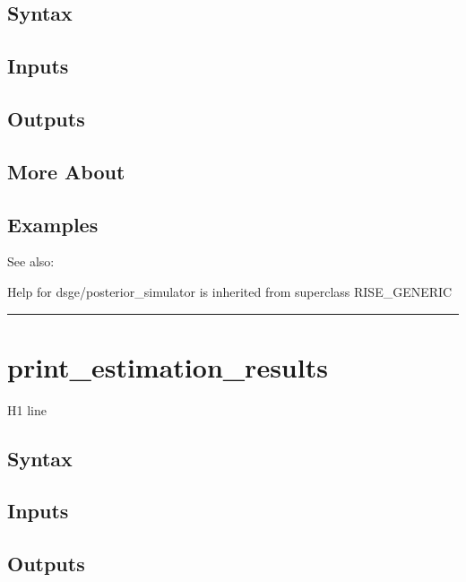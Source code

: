 \documentclass[letterpaper,10pt,english]{sphinxmanual}
\begin{document}
\subsection{Syntax}
\label{classes/models/@dsge/dsge:id123}

\subsection{Inputs}
\label{classes/models/@dsge/dsge:id124}

\subsection{Outputs}
\label{classes/models/@dsge/dsge:id125}

\subsection{More About}
\label{classes/models/@dsge/dsge:id126}

\subsection{Examples}
\label{classes/models/@dsge/dsge:id127}
See also:

Help for dsge/posterior\_simulator is inherited from superclass RISE\_GENERIC


\bigskip\hrule{}\bigskip



\section{print\_estimation\_results}
\label{classes/models/@dsge/dsge:print-estimation-results}\label{classes/models/@dsge/dsge:id128}
H1 line


\subsection{Syntax}
\label{classes/models/@dsge/dsge:id129}

\subsection{Inputs}
\label{classes/models/@dsge/dsge:id130}

\subsection{Outputs}
\label{classes/models/@dsge/dsge:id131}
\end{document}
